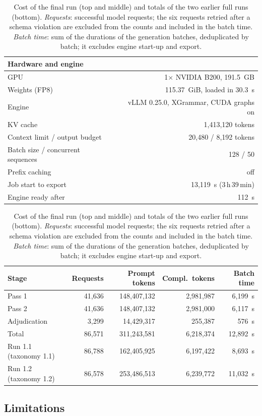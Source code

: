 \begin{table}[t]
\centering
\footnotesize
\setlength{\tabcolsep}{4pt}
\begin{tabular}{@{}lr@{}}
\toprule
Hardware and engine & \\
\midrule
GPU & 1$\times$ NVIDIA B200, 191.5~GB \\
Weights (FP8) & 115.37~GiB, loaded in 30.3~s \\
Engine & vLLM 0.25.0, XGrammar, CUDA graphs on \\
KV cache & 1,413,120 tokens \\
Context limit / output budget & 20,480 / 8,192 tokens \\
Batch size / concurrent sequences & 128 / 50 \\
Prefix caching & off \\
Job start to export & 13,119~s (3\,h\,39\,min) \\
Engine ready after & 112~s \\
\bottomrule
\end{tabular}

\medskip
\begin{tabular}{@{}lrrrr@{}}
\toprule
Stage & Requests & Prompt tokens & Compl.\ tokens & Batch time \\
\midrule
Pass 1 & 41,636 & 148,407,132 & 2,981,987 & 6,199~s \\
Pass 2 & 41,636 & 148,407,132 & 2,981,000 & 6,117~s \\
Adjudication & 3,299 & 14,429,317 & 255,387 & 576~s \\
Total & 86,571 & 311,243,581 & 6,218,374 & 12,892~s \\
\midrule
Run 1.1 (taxonomy 1.1) & 86,788 & 162,405,925 & 6,197,422 & 8,693~s \\
Run 1.2 (taxonomy 1.2) & 86,578 & 253,486,513 & 6,239,772 & 11,032~s \\
\bottomrule
\end{tabular}
\caption{Cost of the final run (top and middle) and totals of the two earlier full runs (bottom). \emph{Requests}: successful model requests; the six requests retried after a schema violation are excluded from the counts and included in the batch time. \emph{Batch time}: sum of the durations of the generation batches, deduplicated by batch; it excludes engine start-up and export.}
\label{tab:ka-cost}
\end{table}

\subsection{Limitations}
\label{app:ka-limitations}

